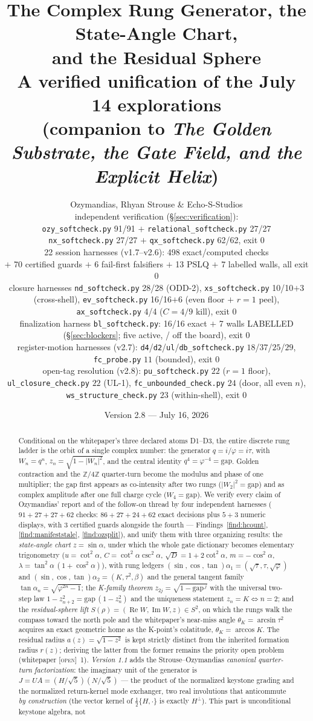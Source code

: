 \documentclass[11pt]{article}
\title{\bfseries The Complex Rung Generator, the State-Angle Chart,\\
and the Residual Sphere\\[4pt]
\large A verified unification of the July 14 explorations\\
(companion to \emph{The Golden Substrate, the Gate Field, and the Explicit Helix})}
\author{Ozymandias, Rhyan Strouse \& Echo-S-Studios\\[2pt]
\small independent verification (\S\ref{sec:verification}):\\
\small \texttt{ozy\_softcheck.py} 91/91 $+$ \texttt{relational\_softcheck.py} 27/27\\
\small \texttt{nx\_softcheck.py} 27/27 $+$ \texttt{qx\_softcheck.py} 62/62, exit 0\\
\small 22 session harnesses (v1.7--v2.6): 498 exact/computed checks\\
\small $+$ 70 certified guards $+$ 6 fail-first falsifiers $+$ 13 PSLQ $+$ 7 labelled walls, all exit 0\\
\small closure harnesses \texttt{nd\_softcheck.py} 28/28 (ODD-2), \texttt{xs\_softcheck.py} 10/10$+$3 (cross-shell), \texttt{ev\_softcheck.py} 16/16$+$6 (even floor $+$ $r{=}1$ peel), \texttt{ax\_softcheck.py} 4/4 ($C{=}4/9$ kill), exit 0\\
\small finalization harness \texttt{bl\_softcheck.py}: 16/16 exact $+$ 7 walls LABELLED (\S\ref{sec:blockers}; five active, \hx{BL-G4}/\hx{BL-G7} off the board), exit 0\\
\small register-motion harnesses (v2.7): \texttt{d4}/\texttt{d2}/\texttt{ul}/\texttt{db\_softcheck.py} $18$/$37$/$25$/$29$, \texttt{fc\_probe.py} $11$ (bounded), exit 0\\
\small open-tag resolution (v2.8): \texttt{pu\_softcheck.py} $22$ ($r{=}1$ floor), \texttt{ul\_closure\_check.py} $22$ (UL-1), \texttt{fc\_unbounded\_check.py} $24$ (door, all even $n$), \texttt{ws\_structure\_check.py} $23$ (within-shell), exit 0}
\date{Version 2.8 --- July 16, 2026}
\newcommand{\tagO}{\textcolor{cO}{\textsc{[open]}}}
\newcommand{\Z}{\mathbb{Z}}
\newcommand{\gp}{\varphi}
\newcommand{\gapc}{\mathrm{gap}}
\DeclareMathOperator{\Rea}{Re}
\DeclareMathOperator{\Ima}{Im}
\theoremstyle{plain}
\theoremstyle{definition}
\theoremstyle{remark}
\begin{document}
\maketitle

\begin{abstract}
\noindent
Conditional on the whitepaper's three declared atoms D1--D3, the entire discrete
rung ladder is the orbit of a single complex number: the generator
$q=i/\gp=i\tau$, with $W_n=q^n$, $z_n=\sqrt{1-|W_n|^2}$, and the central identity
$q^4=\gp^{-4}=\gapc$. Golden contraction and the $\Z/4\Z$ quarter-turn become the
modulus and phase of one multiplier; the gap first appears as co-intensity after
two rungs ($|W_2|^2=\gapc$) and as complex amplitude after one full charge cycle
($W_4=\gapc$). We verify every claim of Ozymandias' report and of the follow-on
thread by four independent harnesses ($91+27+27+62$ checks: $86{+}27{+}24{+}62$
exact decisions plus $5{+}3$ numeric displays, with $3$ certified guards
alongside the fourth --- Findings~\ref{find:hcount}, \ref{find:manifeststale},
\ref{find:ozsplit}), and unify them with three
organizing results: the \emph{state-angle chart} $z=\sin\alpha$, under which the
whole gate dictionary becomes elementary trigonometry ($u=\cot^2\alpha$,
$C=\cot^2\alpha\csc^2\alpha$, $\sqrt D=1+2\cot^2\alpha$, $m=-\cos^2\alpha$,
$\lambda=\tan^2\alpha\,(1+\cos^2\alpha)$), with rung ledgers
$(\sin,\cos,\tan)\alpha_1=(\sqrt\tau,\tau,\sqrt\gp)$ and
$(\sin,\cos,\tan)\alpha_2=(K,\tau^2,\beta)$ and the general tangent family
$\tan\alpha_n=\sqrt{\gp^{2n}-1}$; the \emph{K-family theorem}
$z_{2j}=\sqrt{1-\gapc^{\,j}}$ with the universal two-step law
$1-z_{n+2}^2=\gapc\,(1-z_n^2)$ and the uniqueness statement $z_n=K\iff n=2$; and
the \emph{residual-sphere lift} $S(\rho)=(\Rea W,\Ima W,z)\in S^2$, on which the
rungs walk the compass toward the north pole and the whitepaper's near-miss angle
$\theta_K=\arcsin\tau^2$ acquires an exact geometric home as the K-point's
colatitude, $\theta_K=\arccos K$. The residual radius $a(z)=\sqrt{1-z^2}$ is kept
strictly distinct from the inherited formation radius $r(z)$; deriving the latter
from the former remains the priority open problem (whitepaper \tagO{}~1). \emph{Version 1.1}
adds the Strouse--Ozymandias \emph{canonical quarter-turn factorization}: the
imaginary unit of the generator is
$J=UA=(H/\sqrt5)(N/\sqrt5)$ --- the product of the normalized keystone grading
and the normalized return-kernel mode exchanger, two real involutions that
anticommute \emph{by construction} (the vector kernel of $\tfrac12\{H,\cdot\}$
is exactly $H^\perp$). This part is unconditional keystone algebra, not

\end{abstract}
\end{document}
